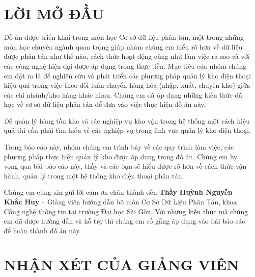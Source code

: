 \documentclass[a4paper,12pt]{report}
\begin{document}
\chapter*{\centering LỜI MỞ ĐẦU}

\justifying
\quad Đồ án được triển khai trong môn học Cơ sở dữ liệu phân tán, một trong những môn học chuyên ngành quan trọng giúp nhóm chúng em hiểu rõ hơn về dữ liệu được phân tán như thế nào, cách thức hoạt động cũng như làm việc ra sao và với các công nghệ hiện đại được áp dụng trong thực tiễn. Mục tiêu của nhóm chúng em đặt ra là để nghiên cứu và phát triển các phương pháp quản lý kho điện thoại hiệu quả trong việc theo dõi luân chuyển hàng hóa (nhập, xuất, chuyển kho) giữa các chi nhánh/kho hàng khác nhau. Chúng em đã áp dụng những kiến thức đã học về cơ sở dữ liệu phân tán để đưa vào việc thực hiện đồ án này.

\vspace{1em}

\quad Để quản lý hàng tồn kho và các nghiệp vụ kho vận trong hệ thống một cách hiệu quả thì cần phải tìm hiểu về các nghiệp vụ trong lĩnh vực quản lý kho điện thoại.

\vspace{1em}

\quad Trong báo cáo này, nhóm chúng em trình bày về các quy trình làm việc, các phương pháp thực hiện quản lý kho được áp dụng trong đồ án. Chúng em hy vọng qua bài báo cáo này, thầy và các bạn sẽ hiểu được rõ hơn về cách thức vận hành, quản lý trong một hệ thống kho điện thoại phân tán.

\vspace{1em}

\quad Chúng em cũng xin gửi lời cảm ơn chân thành đến \textbf{Thầy Huỳnh Nguyễn Khắc Huy} – Giảng viên hướng dẫn bộ môn Cơ Sở Dữ Liệu Phân Tán, khoa Công nghệ thông tin tại trường Đại học Sài Gòn. Với những kiến thức mà chúng em đã được hướng dẫn và hỗ trợ thì chúng em cố gắng áp dụng vào bài báo cáo để hoàn thành đồ án này.

\chapter*{NHẬN XÉT CỦA GIẢNG VIÊN}

\vspace{0.5cm}

\noindent\makebox[\textwidth]{\dotfill}

\vspace{0.5cm}
\noindent\makebox[\textwidth]{\dotfill}
\end{document}

